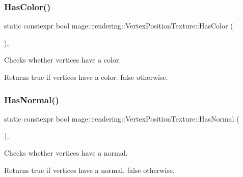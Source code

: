 \subsubsection{\texorpdfstring{Has\+Color()}{HasColor()}}
{\footnotesize\ttfamily static constexpr bool mage\+::rendering\+::\+Vertex\+Position\+Texture\+::\+Has\+Color (\begin{DoxyParamCaption}{ }\end{DoxyParamCaption})\hspace{0.3cm}{\ttfamily [static]}, {\ttfamily [noexcept]}}

Checks whether vertices have a color.

\begin{DoxyReturn}{Returns}
{\ttfamily true} if vertices have a color. {\ttfamily false} otherwise. 
\end{DoxyReturn}
\hypertarget{structmage_1_1rendering_1_1_vertex_position_texture_abd20ebeb7462cc449cd4a41cf4d6c2c9}{}\label{structmage_1_1rendering_1_1_vertex_position_texture_abd20ebeb7462cc449cd4a41cf4d6c2c9} 
\subsubsection{\texorpdfstring{Has\+Normal()}{HasNormal()}}
{\footnotesize\ttfamily static constexpr bool mage\+::rendering\+::\+Vertex\+Position\+Texture\+::\+Has\+Normal (\begin{DoxyParamCaption}{ }\end{DoxyParamCaption})\hspace{0.3cm}{\ttfamily [static]}, {\ttfamily [noexcept]}}

Checks whether vertices have a normal.

\begin{DoxyReturn}{Returns}
{\ttfamily true} if vertices have a normal. {\ttfamily false} otherwise. 
\end{DoxyReturn}
\hypertarget{structmage_1_1rendering_1_1_vertex_position_texture_a251093bc0caad749852ab5138f306909}{}\label{structmage_1_1rendering_1_1_vertex_position_texture_a251093bc0caad749852ab5138f306909} 
